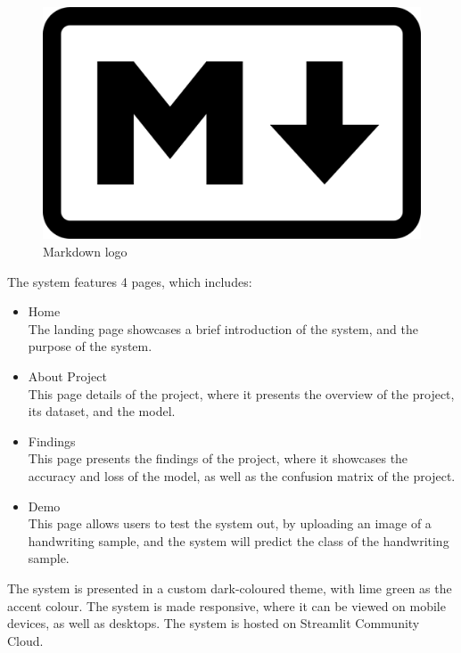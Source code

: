 \begin{figure}[h]
    \centering
    \includegraphics[scale=0.1]{mainmatter/images/research methodology/markdown.png}
    \caption{Markdown logo}
    \label{fig:markdown}
\end{figure}

\newpage
The system features 4 pages, which includes:

\begin{itemize}
    \item Home\\
    The landing page showcases a brief introduction of the system, and the purpose of the system.\\
    \item About Project\\
    This page details of the project, where it presents the overview of the project, its dataset, and the model.\\
    \item Findings\\
    This page presents the findings of the project, where it showcases the accuracy and loss of the model, as well as the confusion matrix of the project.\\
    \item Demo\\
    This page allows users to test the system out, by uploading an image of a handwriting sample, and the system will predict the class of the handwriting sample.\\
\end{itemize}

The system is presented in a custom dark-coloured theme, with lime green as the accent colour. The system is made responsive, where it can be viewed on mobile devices, as well as desktops. The system is hosted on Streamlit Community Cloud.

